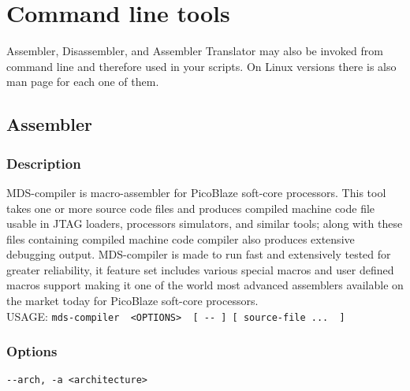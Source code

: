 \section{Command line tools}
    Assembler, Disassembler, and Assembler Translator may also be invoked from command line and therefore used in your scripts.
    On Linux versions there is also man page for each one of them.

    \subsection{Assembler}
        \subsubsection{Description}
        MDS-compiler is macro-assembler for PicoBlaze soft-core processors. This tool takes one or more source code files and produces compiled machine code file usable in JTAG loaders, processors
        simulators, and similar tools; along with these files containing compiled machine code compiler also produces extensive debugging
        output. MDS-compiler is made to run fast and extensively tested for greater reliability, it feature set includes various special
        macros and user defined macros support making it one of the world most advanced assemblers available on the market today for PicoBlaze
        soft-core processors.\\

        USAGE:
        {
            \usecodefont
            \verb'mds-compiler  <OPTIONS>  [ -- ] [ source-file ...  ]'\\
        }

        \subsubsection{Options}
            {
                \usecodefont
                \verb'--arch, -a <architecture>'\\
            }

